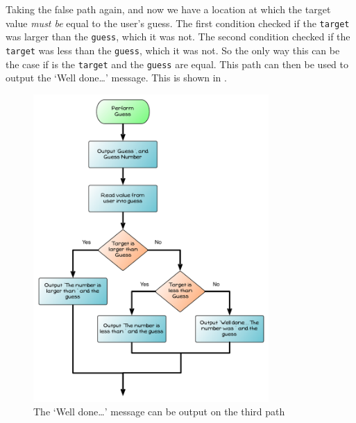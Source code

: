 \clearpage
Taking the false path again, and now we have a location at which the target value \emph{must be} equal to the user's guess. The first condition checked if the \texttt{target} was larger than the \texttt{guess}, which it was not. The second condition checked if the \texttt{target} was less than the \texttt{guess}, which it was not. So the only way this can be the case if is the \texttt{target} and the \texttt{guess} are equal. This path can then be used to output the `Well done\ldots' message. This is shown in . 

\begin{figure}[htbp]
   \centering
   \includegraphics[width=0.8\textwidth]{./topics/control-flow/diagrams/PerformGuess4} 
   \caption{The `Well done\ldots' message can be output on the third path}
   \label{fig:perform-guess-4}
\end{figure}


